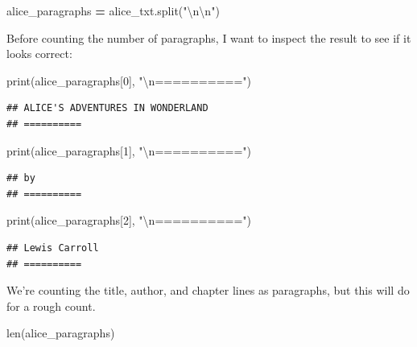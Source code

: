 \documentclass[
]{book}
\newenvironment{Shaded}{\begin{snugshade}}{\end{snugshade}}
\newcommand{\BuiltInTok}[1]{#1}
\newcommand{\CharTok}[1]{\textcolor[rgb]{0.31,0.60,0.02}{#1}}
\newcommand{\DecValTok}[1]{\textcolor[rgb]{0.00,0.00,0.81}{#1}}
\newcommand{\NormalTok}[1]{#1}
\newcommand{\OperatorTok}[1]{\textcolor[rgb]{0.81,0.36,0.00}{\textbf{#1}}}
\newcommand{\StringTok}[1]{\textcolor[rgb]{0.31,0.60,0.02}{#1}}
\begin{document}
\begin{Shaded}
\begin{Highlighting}[]
\NormalTok{alice\_paragraphs }\OperatorTok{=}\NormalTok{ alice\_txt.split(}\StringTok{"}\CharTok{\textbackslash{}n\textbackslash{}n}\StringTok{"}\NormalTok{)}
\end{Highlighting}
\end{Shaded}

Before counting the number of paragraphs, I want to inspect the result to see if it looks correct:

\begin{Shaded}
\begin{Highlighting}[]
\BuiltInTok{print}\NormalTok{(alice\_paragraphs[}\DecValTok{0}\NormalTok{], }\StringTok{"}\CharTok{\textbackslash{}n}\StringTok{=========="}\NormalTok{)}
\end{Highlighting}
\end{Shaded}

\begin{verbatim}
## ﻿ALICE'S ADVENTURES IN WONDERLAND 
## ==========
\end{verbatim}

\begin{Shaded}
\begin{Highlighting}[]
\BuiltInTok{print}\NormalTok{(alice\_paragraphs[}\DecValTok{1}\NormalTok{], }\StringTok{"}\CharTok{\textbackslash{}n}\StringTok{=========="}\NormalTok{)}
\end{Highlighting}
\end{Shaded}

\begin{verbatim}
## by 
## ==========
\end{verbatim}

\begin{Shaded}
\begin{Highlighting}[]
\BuiltInTok{print}\NormalTok{(alice\_paragraphs[}\DecValTok{2}\NormalTok{], }\StringTok{"}\CharTok{\textbackslash{}n}\StringTok{=========="}\NormalTok{)}
\end{Highlighting}
\end{Shaded}

\begin{verbatim}
## Lewis Carroll 
## ==========
\end{verbatim}

We're counting the title, author, and chapter lines as paragraphs, but this will do for a rough count.

\begin{Shaded}
\begin{Highlighting}[]
\BuiltInTok{len}\NormalTok{(alice\_paragraphs)}
\end{Highlighting}
\end{Shaded}
\end{document}
